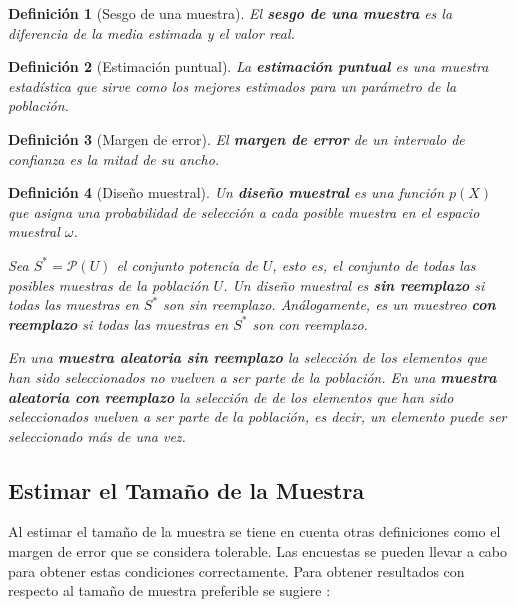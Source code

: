 \documentclass[conference]{IEEEtran}
\newtheorem{definition}{Definición}
\begin{document}
\bigbreak

\begin{definition}[Sesgo de una muestra]
    El \textbf{sesgo de una muestra} es la diferencia de la media estimada y el valor real.
\end{definition}

\bigbreak

\begin{definition}[Estimación puntual]
    La \textbf{estimación puntual} es una muestra estadística que sirve como los mejores estimados para un parámetro de la población.
\end{definition}

\bigbreak

\begin{definition}[Margen de error]
    El \textbf{margen de error} de un intervalo de confianza es la mitad de su ancho.
\end{definition}

\bigbreak

\begin{definition}[Diseño muestral]
    Un \textbf{diseño muestral} es una función $p(X)$ que asigna una probabilidad de selección a cada posible muestra en el espacio muestral $\omega$.
    
    \bigbreak
    
    Sea $S^* = \mathcal{P}(U)$ el conjunto potencia de $U$, esto es, el conjunto de todas las posibles muestras de la población $U$. Un diseño muestral es \textbf{sin reemplazo} si todas las muestras en $S^*$ son sin reemplazo. Análogamente, es un muestreo \textbf{con reemplazo} si todas las muestras en $S^*$ son con reemplazo.

    \bigbreak
    
    En una \textbf{muestra aleatoria sin reemplazo} la selección de los elementos que han sido seleccionados no vuelven a ser parte de la población. En una \textbf{muestra aleatoria con reemplazo} la selección de de los elementos que han sido seleccionados vuelven a ser parte de la población, es decir, un elemento puede ser seleccionado más de una vez.
\end{definition}

\bigbreak

\subsection{Estimar el Tamaño de la Muestra}

Al estimar el tamaño de la muestra se tiene en cuenta otras definiciones como el margen de error que se considera tolerable. Las encuestas se pueden llevar a cabo para obtener estas condiciones correctamente. Para obtener resultados con respecto al tamaño de muestra preferible se sugiere \cite{lohr-2009}:
\end{document}
